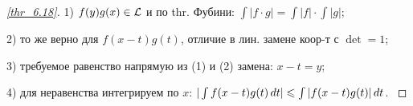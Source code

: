 \begin{proof}[\ref{thr_6.18}]

	1) $f(y) g (x) \in \mathcal{L}$ и по thr. Фубини: $\int |f \cdot g| = \int |f| \cdot \int |g|$;

	2) то же верно для $f(x-t) g(t)$, отличие в лин. замене коор-т с $\det = 1$;

	3) требуемое равенство напрямую из (1) и (2) замена: $x - t = y$;

	4) для неравенства интегрируем по $x$: $|\int f(x-t)g(t) \, d t| \leqslant \int |f(x-t)g(t)|\, d t$.
	\label{proof_6.18}
\end{proof}